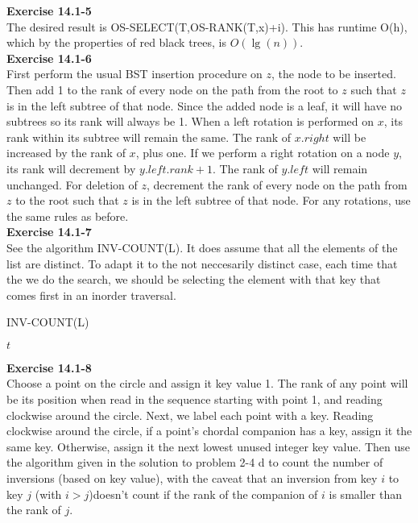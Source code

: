 \documentclass{article}
\begin{document}
\noindent\textbf{ Exercise 14.1-5} \\

The desired result is OS-SELECT(T,OS-RANK(T,x)+i). This has runtime O(h), which by the properties of red black trees, is $O(\lg(n))$.\\

\noindent\textbf{Exercise 14.1-6}\\

First perform the usual BST insertion procedure on $z$, the node to be inserted.  Then add 1 to the rank of every node on the path from the root to $z$ such that $z$ is in the left subtree of that node. Since the added node is a leaf, it will have no subtrees so its rank will always be 1.  When a left rotation is performed on $x$, its rank within its subtree will remain the same.  The rank of $x.right$ will be increased by the rank of $x$, plus one.  If we perform a right rotation on a node $y$, its rank will decrement by $y.left.rank + 1$.  The rank of $y.left$ will remain unchanged.  For deletion of $z$,  decrement the rank of every node on the path from $z$ to the root such that $z$ is in the left subtree of that node.  For any rotations, use the same rules as before.\\

\noindent\textbf{ Exercise 14.1-7} \\

See the algorithm INV-COUNT(L). It does assume that all the elements of the list are distinct. To adapt it to the not neccesarily distinct case, each time that the we do the search, we should be selecting the element with that key that comes first in an inorder traversal.\\


\begin{algorithm}
\caption{INV-COUNT(L)}
\begin{algorithmic}
\EndFor
\State \Return $t$
\end{algorithmic}
\end{algorithm}

\noindent\textbf{Exercise 14.1-8}\\

Choose a point on the circle and assign it key value 1. The rank of any point will be its position when read in the sequence starting with point 1, and reading clockwise around the circle.  Next, we label each point with a key.  Reading clockwise around the circle, if a point's chordal companion has a key, assign it the same key.  Otherwise, assign it the next lowest unused integer key value. Then use the algorithm given in the solution to problem 2-4 d to count the number of inversions (based on key value), with the caveat that an inversion from key $i$ to key $j$ (with $i > j$)doesn't count if the rank of the companion of $i$ is smaller than the rank of $j$.\\
\end{document}
